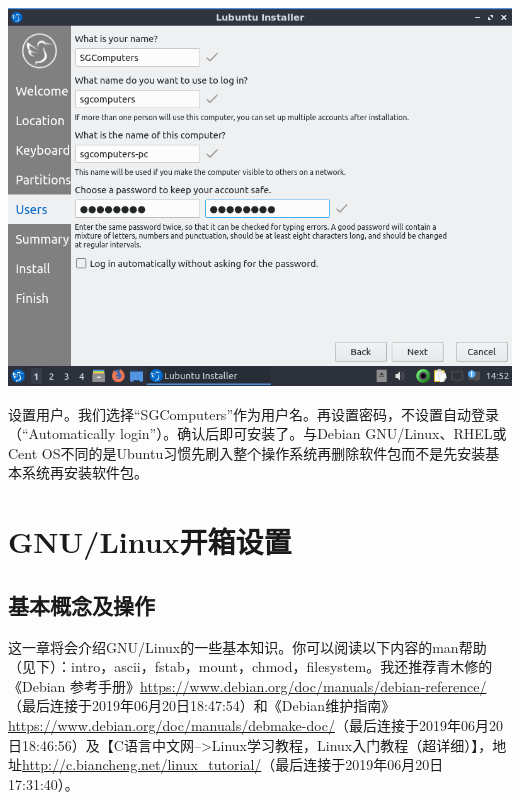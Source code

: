 \begin{center}
	\includegraphics[scale=0.6]{pic/lubinst12}
\end{center} \par
设置用户。我们选择“SGComputers”作为用户名。再设置密码，不设置自动登录（“Automatically login”）。确认后即可安装了。与Debian GNU/Linux、RHEL或Cent OS不同的是Ubuntu习惯先刷入整个操作系统再删除软件包而不是先安装基本系统再安装软件包。
\section{GNU/Linux开箱设置}
\subsection{基本概念及操作}
这一章将会介绍GNU/Linux的一些基本知识。你可以阅读以下内容的man帮助（见下）：intro，ascii，fstab，mount，chmod，filesystem。我还推荐青木修的《Debian 参考手册》\url{https://www.debian.org/doc/manuals/debian-reference/}（最后连接于2019年06月20日18:47:54）和《Debian维护指南》\url{https://www.debian.org/doc/manuals/debmake-doc/}（最后连接于2019年06月20日18:46:56）及【C语言中文网-->Linux学习教程，Linux入门教程（超详细）】，地址\url{http://c.biancheng.net/linux_tutorial/}（最后连接于2019年06月20日17:31:40）。\par
